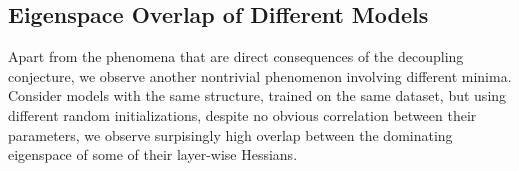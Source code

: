 \subsection{Eigenspace Overlap of Different Models}
\label{sec:models}
Apart from the phenomena that are direct consequences of the decoupling conjecture, we observe another nontrivial phenomenon involving different minima.
Consider models with the same structure, trained on the same dataset, but using different random initializations, despite no obvious correlation between their parameters, we observe surpisingly high overlap between the dominating eigenspace of some of their layer-wise Hessians.


